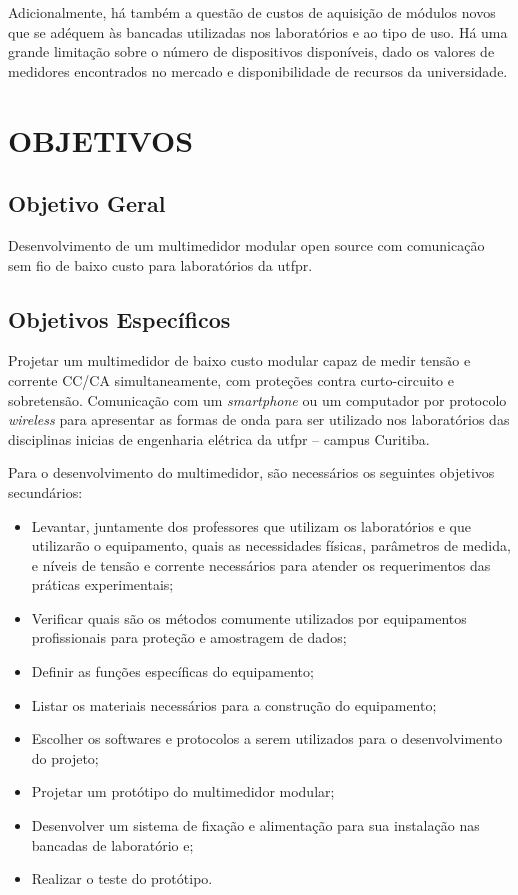 Adicionalmente, há também a questão de custos de aquisição de módulos novos que se adéquem às bancadas utilizadas nos laboratórios e ao tipo de uso. Há uma grande limitação sobre o número de dispositivos disponíveis, dado os valores de medidores encontrados no mercado e disponibilidade de recursos da universidade.

\section{OBJETIVOS}\label{sec:objetivos}

\subsection{Objetivo Geral}\label{sec:objgeral}
Desenvolvimento de um multimedidor modular open source com comunicação sem fio de baixo custo para laboratórios da \gls{utfpr}.


\subsection{Objetivos Específicos}\label{sec:objespec}
Projetar um multimedidor de baixo custo modular capaz de medir tensão e corrente \gls{CC}/\gls{CA} simultaneamente, com proteções contra curto-circuito e sobretensão. Comunicação com um \textit{smartphone} ou um computador por protocolo \textit{wireless} para apresentar as formas de onda para ser utilizado nos laboratórios das disciplinas inicias de engenharia elétrica da \gls{utfpr} – campus Curitiba.

Para o desenvolvimento do multimedidor, são necessários os seguintes objetivos secundários:

\begin{itemize}
    \item Levantar, juntamente dos professores que utilizam os laboratórios e que utilizarão o equipamento, quais as necessidades físicas, parâmetros de medida, e níveis de tensão e corrente necessários para atender os requerimentos das práticas experimentais;
    \item Verificar quais são os métodos comumente utilizados por equipamentos profissionais para proteção e amostragem de dados;
    \item Definir as funções específicas do equipamento;
    \item Listar os materiais necessários para a construção do equipamento;
    \item Escolher os softwares e protocolos a serem utilizados para o desenvolvimento do projeto;
    \item Projetar um protótipo do multimedidor modular;
    \item Desenvolver um sistema de fixação e alimentação para sua instalação nas bancadas de laboratório e;
    \item Realizar o teste do protótipo.
\end{itemize}

